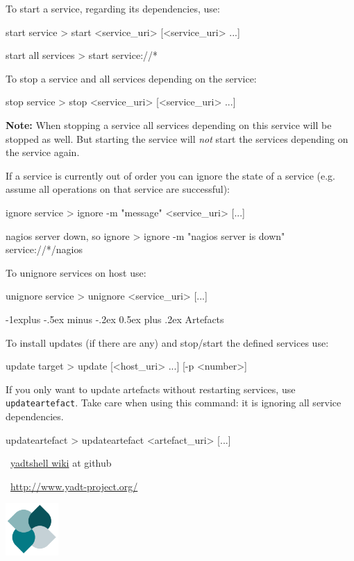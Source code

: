 \documentclass[10pt,landscape]{article}
\makeatletter
\renewcommand{\subsection}{\@startsection{subsection}{2}{0mm}%
                                {-1explus -.5ex minus -.2ex}%
                                {0.5ex plus .2ex}%
                                {\normalfont\normalsize\bfseries}}
\newcommand{\note}[1]{\medskip\textbf{Note:} {#1}\medskip}
\makeatother
\begin{document}
\begin{multicols}{3}
To start a service, regarding its dependencies, use:
\begin{commands}{start service}
> start <service_uri> [<service_uri> ...]
\end{commands}

\begin{examples}{start all services}
> start service://*
\end{examples}

To stop a service and all services depending on the service:
\begin{commands}{stop service}
> stop <service_uri> [<service_uri> ...]
\end{commands}

\note{When stopping a service all services depending on this service will be
stopped as well. But starting the service will \emph{not} start the services
depending on the service again.}


If a service is currently out of order you can ignore the state of a service
(e.g. assume all operations on that service are successful):
\begin{commands}{ignore service}
> ignore -m "message" <service_uri> [...]
\end{commands}

\begin{examples}{nagios server down, so ignore}
> ignore -m "nagios server is down" service://*/nagios
\end{examples}

To unignore services on host use:
\begin{commands}{unignore service}
> unignore <service_uri> [...]
\end{commands}



\subsection{Artefacts}

To install updates (if there are any) and stop/start the defined services use:
\begin{commands}{update target}
> update [<host_uri> ...] [-p <number>]
\end{commands}


If you only want to update artefacts without restarting services,
use \verb+updateartefact+. Take care when using this command:
it is ignoring all service dependencies.
\begin{commands}{updateartefact}
> updateartefact <artefact_uri> [...]
\end{commands}



\begin{minipage}[b]{5cm}
~\hfill\href{https://github.com/yadt/yadtshell/wiki}{yadtshell wiki} at github

~\hfill\href{http://www.yadt-project.org/}{http://www.yadt-project.org/}
\end{minipage}%
\hfill%
\includegraphics[width=2cm,valign=b]{res/yadtlogo}%

\end{multicols}
\end{document}

